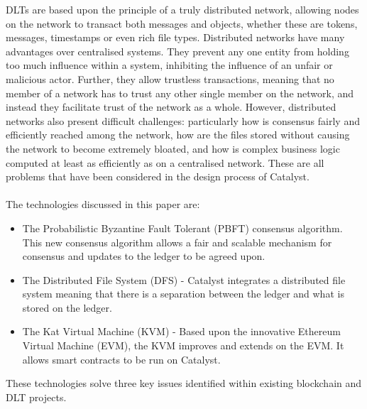 DLTs are based upon the principle of a truly distributed network, allowing nodes on the network to transact both messages and objects, whether these are tokens, messages, timestamps or even rich file types. Distributed networks have many advantages over centralised systems. They prevent any one entity from holding too much influence within a system, inhibiting the influence of an unfair or malicious actor. Further, they allow trustless transactions, meaning that no member of a network has to trust any other single member on the network, and instead they facilitate trust of the network as a whole. However, distributed networks also present difficult challenges: particularly how is consensus fairly and efficiently reached among the network, how are the files stored without causing the network to become extremely bloated, and how is complex business logic computed at least as efficiently as on a centralised network. These are all problems that have been considered in the design process of Catalyst. \\ \\ %

The technologies discussed in this paper are:

\begin{itemize}
\item The Probabilistic Byzantine Fault Tolerant (PBFT) consensus algorithm. This new consensus algorithm allows a fair and scalable mechanism for consensus and updates to the ledger to be agreed upon.
\item The Distributed File System (DFS) - Catalyst integrates a distributed file system meaning that there is a separation between the ledger and what is stored on the ledger.
\item The Kat Virtual Machine (KVM) - Based upon the innovative Ethereum Virtual Machine (EVM), the KVM improves and extends on the EVM. It allows smart contracts to be run on Catalyst. \\
\end{itemize}

These technologies solve three key issues identified within existing blockchain and DLT projects. \\

